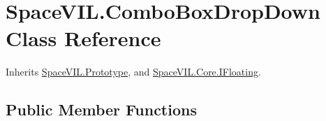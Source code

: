 \hypertarget{class_space_v_i_l_1_1_combo_box_drop_down}{}\section{Space\+V\+I\+L.\+Combo\+Box\+Drop\+Down Class Reference}
\label{class_space_v_i_l_1_1_combo_box_drop_down}


Inherits \mbox{\hyperlink{class_space_v_i_l_1_1_prototype}{Space\+V\+I\+L.\+Prototype}}, and \mbox{\hyperlink{interface_space_v_i_l_1_1_core_1_1_i_floating}{Space\+V\+I\+L.\+Core.\+I\+Floating}}.

\subsection*{Public Member Functions}
